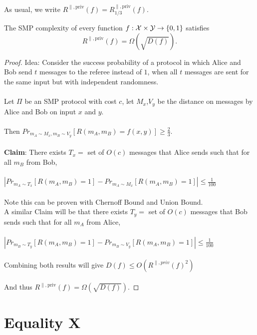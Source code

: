 As usual, we write $R^{\parallel,\mathrm{priv}}(f) = R^{\parallel,\mathrm{priv}}_{1/3}(f)$.

\begin{theorem}
	The SMP complexity of every function $f : \mathcal{X} \times \mathcal{Y} \to \{0,1\}$ satisfies
	\[
	R^{\parallel,\mathrm{priv}}(f) = \Omega(\sqrt{D(f)}).
	\]
\end{theorem}

\begin{proof}
	Idea: Consider the success probability of a protocol in which Alice and Bob send $t$ messages to the referee instead of $1$, when all $t$ messages are sent for the same input but with independent randomness.\\
	\\
	Let $\Pi$ be an SMP protocol with cost $c$, let $M_x$,$V_y$ be the distance on messages by Alice and Bob on input $x$ and $y$.\\
	\\
	Then $Pr_{m_A\sim M_x,m_B\sim V_y}[R(m_A,m_B)=f(x,y)]\ge\frac23$.\\
	\\
	\textbf{Claim}: There exists $T_x=$ set of $O(c)$ messages that Alice sends such that for all $m_B$ from Bob,\\
	\\
	$|Pr_{m_A\sim T_x}[R(m_A,m_B)=1]-Pr_{m_A\sim M_x}[R(m_A,m_B)=1]| \leq \frac1{100}$\\
	\\
	Note this can be proven with Chernoff Bound and Union Bound.\\
	
	A similar Claim will be that  there exists $T_y=$ set of $O(c)$ messages that Bob sends such that for all $m_A$ from Alice,\\
	\\
	$|Pr_{m_B\sim T_y}[R(m_A,m_B)=1]-Pr_{m_B\sim V_y}[R(m_A,m_B)=1]| \leq \frac1{100}$\\
	\\
	Combining both results will give $D(f)\leq O(R^{\parallel,priv}(f)^2)$\\
	\\
	And thus $R^{\parallel,\mathrm{priv}}(f) = \Omega(\sqrt{D(f)})$.
\end{proof}



\section{Equality X}


